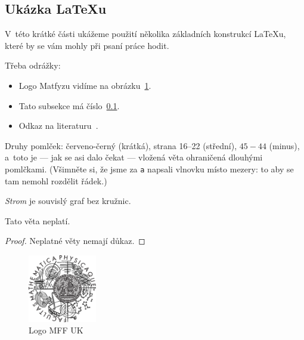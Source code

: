 
\subsection{Ukázka \LaTeX{}u}
\label{ssec:ukazka}

V~této krátké části ukážeme použití několika základních konstrukcí \LaTeX{}u,
které by se vám mohly při psaní práce hodit.

Třeba odrážky:

\begin{itemize}
\item Logo Matfyzu vidíme na obrázku~\ref{fig:mff}.
\item Tato subsekce má číslo~\ref{ssec:ukazka}.
\item Odkaz na literaturu~\cite{lamport94}.
\end{itemize}

Druhy pomlček:
červeno-černý (krátká),
strana 16--22 (střední),
$45-44$ (minus),
a~toto je --- jak se asi dalo čekat --- vložená věta ohraničená dlouhými pomlčkami.
(Všimněte si, že jsme za \verb|a| napsali vlnovku místo mezery: to aby se
tam nemohl rozdělit řádek.)



\begin{define}
{\sl Strom} je souvislý graf bez kružnic.
\end{define}

\begin{theorem}
Tato věta neplatí.
\end{theorem}

\begin{proof}
Neplatné věty nemají důkaz.
\end{proof}

\begin{figure}
	\centering
	\includegraphics[width=30mm]{./logo.eps}
	\caption{Logo MFF UK}
	\label{fig:mff}
\end{figure}
